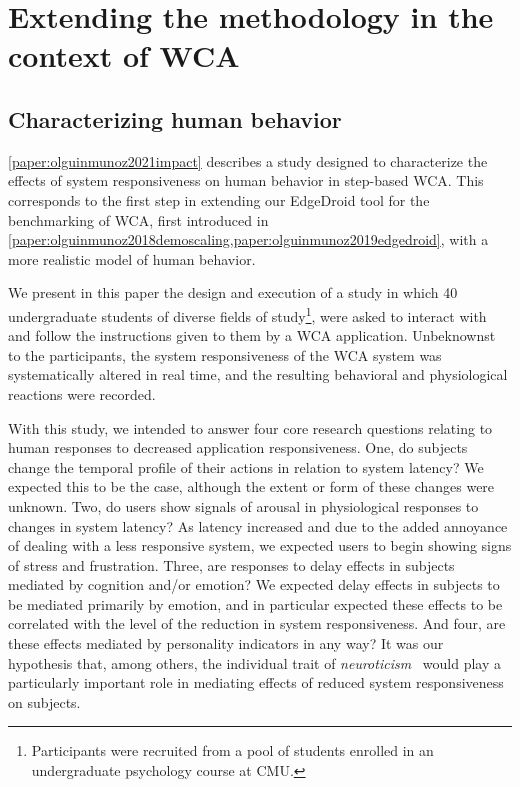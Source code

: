 \section{Extending the methodology in the context of \gls{WCA}}


\subsection{Characterizing human behavior}

\cref{paper:olguinmunoz2021impact} describes a study designed to characterize the effects of system responsiveness on human behavior in step-based \gls{WCA}.
This corresponds to the first step in extending our EdgeDroid tool for the benchmarking of \gls{WCA}, first introduced in \cref{paper:olguinmunoz2018demoscaling,paper:olguinmunoz2019edgedroid}, with a more realistic model of human behavior.

We present in this paper the design and execution of a study in which \num{40} undergraduate students of diverse fields of
study\footnote{%
    Participants were recruited from a pool of students enrolled in an undergraduate psychology course at \gls{CMU}.
}, were asked to interact with and follow the instructions given to them by a \gls{WCA} application.
Unbeknownst to the participants, the system responsiveness of the \gls{WCA} system was systematically altered in real time, and the resulting behavioral and physiological reactions were recorded.

With this study, we intended to answer four core research questions relating to human responses to decreased application responsiveness.
One, do subjects change the temporal profile of their actions in relation to system latency?
We expected this to be the case, although the extent or form of these changes were unknown.
Two, do users show signals of arousal in physiological responses to changes in system latency?
As latency increased and due to the added annoyance of dealing with a less responsive system, we expected users to begin showing signs of stress and frustration.
Three, are responses to delay effects in subjects mediated by cognition and/or emotion?
We expected delay effects in subjects to be mediated primarily by emotion, and in particular expected these effects to be correlated with the level of the reduction in system responsiveness.
And four, are these effects mediated by personality indicators in any way?
It was our hypothesis that, among others, the individual trait of \emph{neuroticism}~\cite{john1999big} would play a particularly important role in mediating effects of reduced system responsiveness on subjects.

